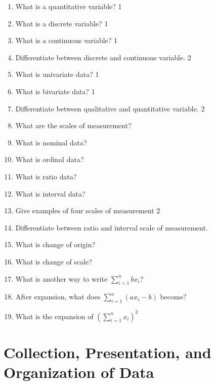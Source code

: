 \documentclass[a4paper,oneside]{book}
\begin{document}
\begin{enumerate}
\item What is a quantitative variable? \hfill 1

\item What is a discrete variable? \hfill 1

\item What is a continuous variable? \hfill 1

\item Differentiate between discrete and continuous variable. \hfill 2

\item What is univariate data? \hfill 1

\item What is bivariate data? \hfill 1

\item Differentiate between qualitative and quantitative variable. \hfill 2

\item What are the scales of measurement?

\item What is nominal data?

\item What is ordinal data?

\item What is ratio data?

\item What is interval data?

\item Give examples of four scales of measurement \hfill 2

\item Differentiate between ratio and interval scale of measurement.

\item What is change of origin?

\item What is change of scale?

\item What is another way to write $\displaystyle \sum_{i=1}^n bx_i$?

\item After expansion, what does $\displaystyle \sum_{i=1}^n \left( ax_i-b \right)$ become?

\item What is the expansion of $\displaystyle \left( \sum_{i=1}^n x_i\right)^2$

\end{enumerate}

\chapter{Collection, Presentation, and Organization of Data} 
\end{document}
